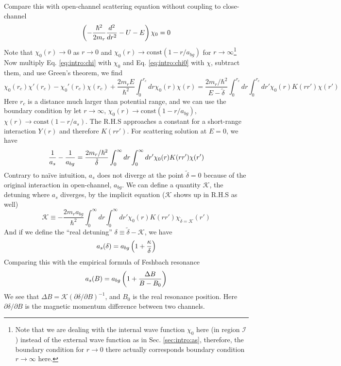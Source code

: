 Compare this with open-channel scattering \sch equation without coupling to close-channel
\begin{equation}\label{eq:intro:chi0}
\left(-\frac{\hbar^{2}}{2m_{r}}\frac{d^{2}}{dr^{2}}-U-E\right)\chi_{0}=0
\end{equation}
Note that $\chi_{0}(r)\rightarrow0$ as $r\rightarrow0$ and $\chi_{0}(r)\rightarrow\text{const}(1-r/a_{bg})$ for $r\rightarrow\infty$\footnote{Note that we are dealing with the internal wave function $\chi_{0}$ here (in region $\mathcal{I}$) instead of the external wave function as in Sec. \ref{sec:intro:as}, therefore, the boundary condition for $r\rightarrow0$ there actually corresponds boundary condition $r\rightarrow\infty$ here.}  Now multiply Eq. \ref{eq:intro:chi} with $\chi_{0}$ and Eq. \ref{eq:intro:chi0} with $\chi$, subtract them, and use Green's theorem, we find 
\begin{equation}
\chi_{0}(r_{c})\chi'(r_{c})-\chi_{0}'(r_{c})\chi(r_{c})+\frac{2m_{r}E}{\hbar^{2}}\int_{0}^{r_{c}}dr\chi_{0}(r)\chi(r)
=\frac{2m_{r}/\hbar^{2}}{E-\tilde\delta}\int_{0}^{r_{c}}dr\int_{0}^{r_{c}}dr'\chi_{0}(r)K(rr')\chi(r')
\end{equation}
Here $r_{c}$ is a  distance much larger than potential range, and we can use the boundary condition by let $r\rightarrow\infty$, $\chi_{0}(r)\rightarrow\text{const}(1-r/a_{bg})$, $\chi(r)\rightarrow\text{const}(1-r/a_{s})$.  The R.H.S approaches a constant for a short-range interaction $Y(r)$ and therefore $K(rr')$.  For scattering solution at  $E=0$, we have 
\begin{equation}
\frac{1}{a_{s}}-\frac{1}{a_{bg}}=\frac{2m_{r}/\hbar^{2}}{\tilde\delta}\int_{0}^{\infty}dr\int_{0}^{\infty}dr'\chi_{0}(r)K(rr')\chi(r')
\end{equation}
Contrary to na\"ive intuition, $a_{s}$ does not diverge at the point $\tilde\delta=0$ because of the original interaction in open-channel, $a_{bg}$.  We can define a quantity $\mathcal{K}$, the detuning where $a_{s}$ diverges, by the implicit equation ($\mathcal{K}$ shows up in R.H.S as well)
\begin{equation}\label{eq:intro:kappa}
\mathcal{K}\equiv-\frac{2m_{r}a_{bg}}{\hbar^{2}}\int_{0}^{\infty}{dr}\int_{0}^{\infty}dr'\chi_{0}(r)K(rr')\chi_{\tilde\delta=\mathcal{K}}(r')
\end{equation}
And if we define the ``real detuning'' $\delta\equiv\tilde\delta-\mathcal{K}$, we have 
\begin{equation}
a_{s}(\delta)=a_{bg}\left(1+\frac{\kappa}{\delta}\right)
\end{equation}
Comparing this with the empirical formula of Feshbach resonance
\begin{equation}
a_{s}(B)=a_{bg}\left(1+\frac{\Delta{B}}{B-B_{0}}\right)
\end{equation}
We see that $\Delta{B}=\mathcal{K}(\partial\delta/\partial{B})^{-1}$, and $B_{0}$ is the real resonance position.  Here $\partial\delta/\partial{B}$ is the magnetic momentum difference between two channels.  

